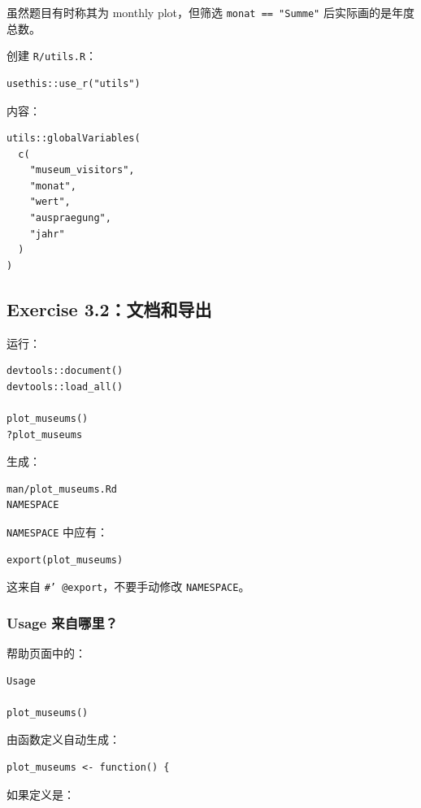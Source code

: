 \documentclass[11pt,a4paper]{ctexart}
\begin{document}
虽然题目有时称其为 monthly plot，但筛选 \texttt{monat == "Summe"} 后实际画的是年度总数。

创建 \texttt{R/utils.R}：

\begin{lstlisting}
usethis::use_r("utils")
\end{lstlisting}

内容：

\begin{lstlisting}
utils::globalVariables(
  c(
    "museum_visitors",
    "monat",
    "wert",
    "auspraegung",
    "jahr"
  )
)
\end{lstlisting}

\subsection{Exercise 3.2：文档和导出}

运行：

\begin{lstlisting}
devtools::document()
devtools::load_all()

plot_museums()
?plot_museums
\end{lstlisting}

生成：

\begin{verbatim}
man/plot_museums.Rd
NAMESPACE
\end{verbatim}

\texttt{NAMESPACE} 中应有：

\begin{verbatim}
export(plot_museums)
\end{verbatim}

这来自 \texttt{\#' @export}，不要手动修改 \texttt{NAMESPACE}。

\subsubsection*{Usage 来自哪里？}

帮助页面中的：

\begin{verbatim}
Usage

plot_museums()
\end{verbatim}

由函数定义自动生成：

\begin{lstlisting}
plot_museums <- function() {
\end{lstlisting}

如果定义是：
\end{document}
